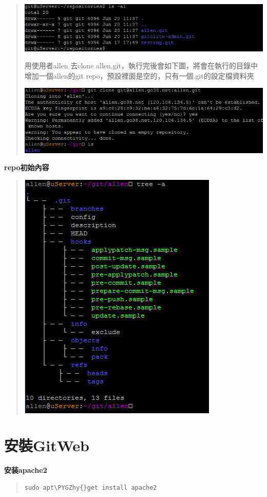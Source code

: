 \documentclass[letterpaper,10pt,english]{sphinxmanual}
\def\PYGZhy{\char`\-}
\begin{document}
\begin{quote}
\includegraphics{gitolite3-addrepo-3.png}

用使用者allen 去clone allen.git，執行完後會如下圖，將會在執行的目錄中增加一個allen的git repo，預設裡面是空的，只有一個.git的設定檔資料夾

\includegraphics{gitolite3-addrepo-4.png}
\end{quote}

\textbf{repo初始內容}
\begin{quote}

\includegraphics{gitolite3-addrepo-5.png}
\end{quote}


\section{安裝GitWeb}
\label{_doc/git/index:gitweb}
\textbf{安装apache2}
\begin{quote}

\begin{Verbatim}[commandchars=\\\{\}]
sudo apt\PYGZhy{}get install apache2
\end{Verbatim}
\end{quote}
\end{document}
